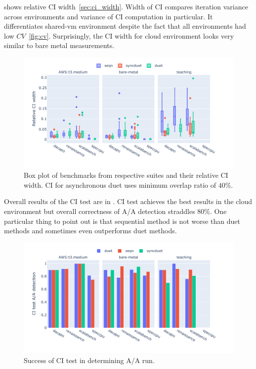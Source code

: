  shows relative CI width~\ref{sec:ci_width}.
Width of CI compares iteration variance across environments and variance of CI computation in particular.
It differentiates shared-vm environment despite the fact that all environments had low $CV$~\ref{fig:cv}.
Surprisingly, the CI width for cloud environment looks very similar to bare metal measurements.

\begin{figure}
	\centering
	\includegraphics[width=1\linewidth]{./figures/ci_width.pdf}
	\caption{
		Box plot of benchmarks from respective suites and their relative CI width. 
		CI for asynchronous duet uses minimum overlap ratio of $40\%$.
	}
	\label{fig:ci_width}
\end{figure}

Overall results of the CI test are in .
CI test achieves the best results in the cloud environment but overall correctness of A/A detection straddles $80\%$.
One particular thing to point out is that sequential method is not worse than duet methods and sometimes even outperforms duet methods.

\begin{figure}
	\centering
	\includegraphics[width=1\linewidth]{./figures/citest_aa_match.pdf}
	\caption{
		Success of CI test in determining A/A run.
	}
	\label{fig:citest_aa}
\end{figure}

